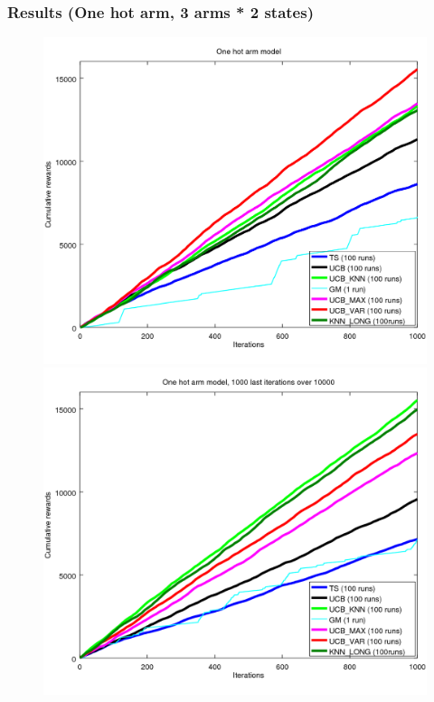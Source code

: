 \documentclass[french]{beamer}
\begin{document}
\begin{frame}
	\frametitle{Results (One hot arm, 3 arms * 2 states)}
	\begin{figure}[h]
		\begin{minipage}[b]{.49\linewidth}
			\includegraphics[width=1.0\textwidth]{begin_1000it.png}

		\end{minipage}
		\hfill
		\begin{minipage}[b]{0.49\linewidth}
			\includegraphics[width=1.0\textwidth]{last_1000it.png}

		\end{minipage}
		\label{fig:f}
	\end{figure}

\end{frame}
\end{document}
